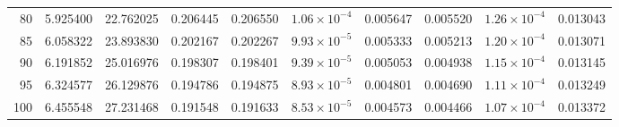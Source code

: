 \begin{tabular}{@{}rrrrrrrrrr@{}}
80 & 5.925400 & 22.762025 & 0.206445 & 0.206550 & $1.06\times10^{-4}$ & 0.005647 & 0.005520 & $1.26\times10^{-4}$ & 0.013043 \\
85 & 6.058322 & 23.893830 & 0.202167 & 0.202267 & $9.93\times10^{-5}$ & 0.005333 & 0.005213 & $1.20\times10^{-4}$ & 0.013071 \\
90 & 6.191852 & 25.016976 & 0.198307 & 0.198401 & $9.39\times10^{-5}$ & 0.005053 & 0.004938 & $1.15\times10^{-4}$ & 0.013145 \\
95 & 6.324577 & 26.129876 & 0.194786 & 0.194875 & $8.93\times10^{-5}$ & 0.004801 & 0.004690 & $1.11\times10^{-4}$ & 0.013249 \\
100 & 6.455548 & 27.231468 & 0.191548 & 0.191633 & $8.53\times10^{-5}$ & 0.004573 & 0.004466 & $1.07\times10^{-4}$ & 0.013372 \\
\hline
\end{tabular}
